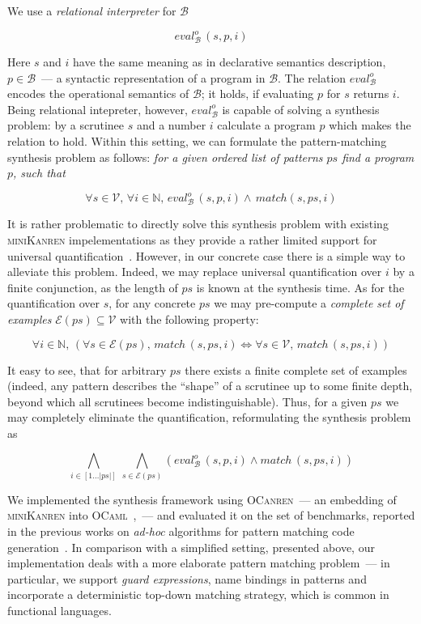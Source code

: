\documentclass[submission,copyright,creativecommons]{eptcs}
\begin{document}
We use a \emph{relational interpreter} for $\mathcal{B}$

\[
eval^o_{\mathcal B}\, (s, p, i)
\]

Here $s$ and $i$ have the same meaning as in declarative semantics description, $p\in\mathcal{B}$~--- a syntactic representation of
a program in $\mathcal{B}$. The relation $eval^o_{\mathcal B}$ encodes the operational semantics of $\mathcal{B}$; it holds, if
evaluating $p$ for $s$ returns $i$. Being relational intepreter, however, $eval^o_{\mathcal B}$ is capable of solving a
synthesis problem: by a scrutinee $s$ and a number $i$ calculate a program $p$ which makes the relation to hold.
Within this setting, we can formulate the pattern-matching synthesis problem as follows: \emph{for a given ordered list of patterns $ps$ find a program $p$, such that}

\[
\forall s\in\mathcal{V},\,\forall i\in\mathbb{N},\,eval^o_{\mathcal B}\, (s, p, i) \wedge\, match (s, ps, i)
\]

It is rather problematic to directly solve this synthesis problem with existing \textsc{miniKanren} impelementations as
they provide a rather limited support for universal quantification~\cite{eigen,moiseenko}. However, in our concrete
case there is a simple way to alleviate this problem. Indeed, we may replace universal quantification over $i$ by
a finite conjunction, as the length of $ps$ is known at the synthesis time. As for the quantification over $s$, for
any concrete $ps$ we may pre-compute a \emph{complete set of examples} $\mathcal{E}(ps)\subseteq\mathcal{V}$ with the following
property:

\[
\forall i\in\mathbb{N},\,(\forall s\in\mathcal{E}(ps),\,match\, (s, ps, i) \Leftrightarrow \forall s\in\mathcal{V},\,match\, (s, ps, i))
\]

It easy to see, that for arbitrary $ps$ there exists a finite complete set of examples (indeed, any pattern describes the ``shape''
of a scrutinee up to some finite depth, beyond which all scrutinees become indistinguishable). Thus, for a given $ps$ we may
completely eliminate the quantification, reformulating the synthesis problem as

\[
\bigwedge_{i\in[1\dots|ps|]}\,\bigwedge_{s\in\mathcal{E}(ps)} (eval^o_{\mathcal B}\, (s, p, i) \wedge match\, (s, ps, i))
\]

We implemented the synthesis framework using \textsc{OCanren}~--- an embedding of \textsc{miniKanren} into \textsc{OCaml}~\cite{ocanren},~---
and evaluated it on the set of benchmarks, reported in the previous works on \emph{ad-hoc} algorithms for pattern matching
code generation~\cite{maranget2001,maranget2008}. In comparison with a simplified setting, presented above, our implementation
deals with a more elaborate pattern matching problem~--- in particular, we support \emph{guard expressions}, name bindings in
patterns and incorporate a deterministic top-down matching strategy, which is common in functional languages.
\end{document}
